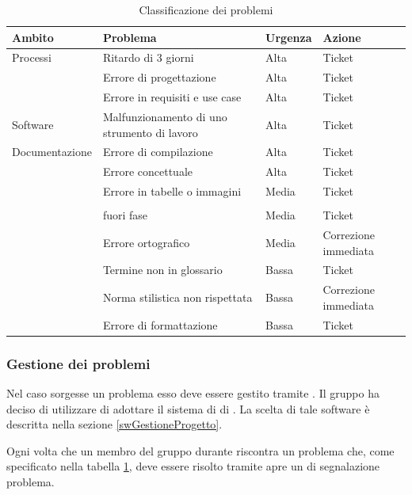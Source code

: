 \documentclass[12pt,a4paper]{article}
\begin{document}
\begin{table}[H]
	\begin{tabular}{p{} p{} p{} p{}}
		\toprule
		\textbf{Ambito}	&	\textbf{Problema}	&	\textbf{Urgenza}	&	\textbf{Azione}\\
		\midrule
		\midrule
		Processi & Ritardo di 3 giorni & Alta & Ticket \\
		\midrule
		& Errore di progettazione & Alta & Ticket \\
		\midrule
		& Errore in requisiti e use case & Alta & Ticket \\
		\midrule
		\midrule
		Software & Malfunzionamento di uno strumento di lavoro & Alta & Ticket \\
		\midrule
		\midrule
		Documentazione & Errore di compilazione & Alta & Ticket \\
		\midrule
		& Errore concettuale & Alta & Ticket \\
		\midrule
		& Errore in tabelle o immagini & Media & Ticket \\\\
		\midrule
		& \mgls{gulpease} fuori fase & Media & Ticket \\
		\midrule
		& Errore ortografico & Media & Correzione immediata \\
		\midrule
		& Termine non in glossario & Bassa & Ticket \\
		\midrule
		& Norma stilistica non rispettata & Bassa & Correzione immediata \\
		\midrule
		& Errore di formattazione & Bassa & Ticket \\
		\bottomrule
	\end{tabular}
	\caption{Classificazione dei problemi}
	\label{tabCalssificazioneProb}
\end{table}

\subsubsection{Gestione dei problemi}\label{gestioneDeiProblemi}
Nel caso sorgesse un problema esso deve essere gestito tramite . Il gruppo ha deciso di utilizzare  di adottare il sistema di  di . La scelta di tale software è descritta nella sezione \ref{swGestioneProgetto}.

Ogni volta che un membro del gruppo durante riscontra un problema che, come specificato nella tabella \ref{tabCalssificazioneProb}, deve essere risolto tramite  apre un  di segnalazione problema.
\end{document}
